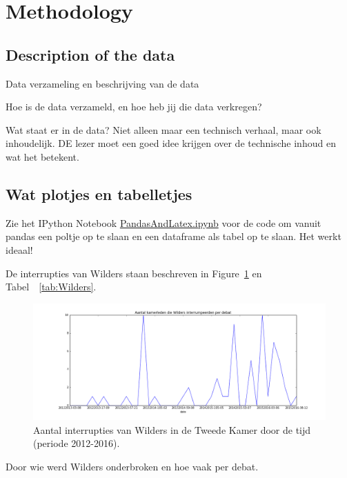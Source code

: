 \section{Methodology}
\label{sec:meth}


\subsection{Description of the data}
Data verzameling en beschrijving van de data

Hoe is de data verzameld, en hoe heb jij die data verkregen?


Wat staat er in de data? Niet alleen maar een technisch verhaal, maar ook inhoudelijk. DE lezer moet een goed idee krijgen over de technische inhoud en wat het betekent.

\pagebreak
\subsection{Wat plotjes en tabelletjes}

Zie het IPython Notebook \url{PandasAndLatex.ipynb} voor de code om vanuit pandas een poltje op te slaan en een dataframe als tabel op te slaan. Het werkt ideaal! 

De interrupties van Wilders staan beschreven in Figure~\ref{fig:wilders} en Tabel~~\ref{tab:Wilders}.


\begin{figure}
\begin{center}
\includegraphics[width=\linewidth]{WildersPlot.png}
\caption{\label{fig:wilders} Aantal interrupties van Wilders in de Tweede Kamer door de tijd (periode 2012-2016).}
\end{center}
\end{figure}


\pagebreak

\begin{table}[h]
\begin{footnotesize}

\end{footnotesize}
\caption{\label{tab:Wilders} Door wie werd Wilders onderbroken en hoe vaak per debat.}
\end{table}


